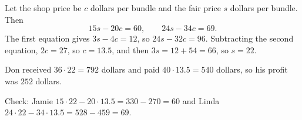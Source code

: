 Let the shop price be $c$ dollars per bundle and the fair price $s$ dollars per bundle. Then
\[15s-20c=60,\qquad 24s-34c=69.\]
The first equation gives $3s-4c=12$, so $24s-32c=96$. Subtracting the second equation, $2c=27$, so $c=13.5$, and then $3s=12+54=66$, so $s=22$.

Don received $36\cdot22=792$ dollars and paid $40\cdot13.5=540$ dollars, so his profit was $\boxed{252}$ dollars.

Check: Jamie $15\cdot22-20\cdot13.5=330-270=60$ and Linda $24\cdot22-34\cdot13.5=528-459=69$.
